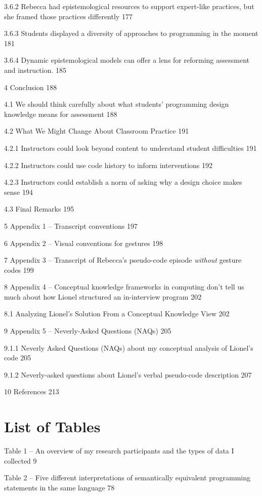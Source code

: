 3.6.2 Rebecca had epistemological resources to support expert-like
practices, but she framed those practices differently 177

3.6.3 Students displayed a diversity of approaches to programming in the
moment 181

3.6.4 Dynamic epistemological models can offer a lens for reforming
assessment and instruction. 185

4 Conclusion 188

4.1 We should think carefully about what students' programming design
knowledge means for assessment 188

4.2 What We Might Change About Classroom Practice 191

4.2.1 Instructors could look beyond content to understand student
difficulties 191

4.2.2 Instructors could use code history to inform interventions 192

4.2.3 Instructors could establish a norm of asking why a design choice
makes sense 194

4.3 Final Remarks 195

5 Appendix 1 -- Transcript conventions 197

6 Appendix 2 -- Visual conventions for gestures 198

7 Appendix 3 -- Transcript of Rebecca's pseudo-code episode
\emph{without} gesture codes 199

8 Appendix 4 -- Conceptual knowledge frameworks in computing don't tell
us much about how Lionel structured an in-interview program 202

8.1 Analyzing Lionel's Solution From a Conceptual Knowledge View 202

9 Appendix 5 -- Neverly-Asked Questions (NAQs) 205

9.1.1 Neverly Asked Questions (NAQs) about my conceptual analysis of
Lionel's code 205

9.1.2 Neverly-asked questions about Lionel's verbal pseudo-code
description 207

10 References 213

\section{List of Tables}\label{list-of-tables}

Table 1 -- An overview of my research participants and the types of data
I collected 9

Table 2 -- Five different interpretations of semantically equivalent
programming statements in the same language 78

